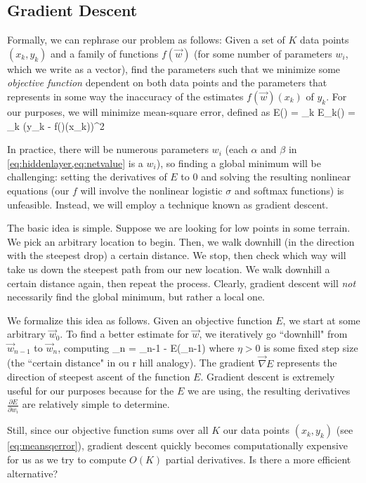 \documentclass{article}
\begin{document}
\subsection{Gradient Descent}

Formally, we can rephrase our problem as follows: Given a set of $K$ data points $(x_k, y_k)$ and a family of functions $f(\vec{w})$ (for some number of parameters $w_i$, which we write as a vector), find the parameters such that we minimize some \emph{objective function} dependent on both data points and the parameters that represents in some way the inaccuracy of the estimates $f(\vec{w})(x_k)$ of $y_k$. For our purposes, we will minimize mean-square error, defined as
\beq
\label{eq:meansqerror}
E() = \sum_k E_k() = \sum_k (y_k - f()(x_k))^2
\eeq

In practice, there will be numerous parameters $w_i$ (each $\alpha$ and $\beta$ in \cref{eq:hiddenlayer,eq:netvalue} is a $w_i$), so finding a global minimum will be challenging: setting the derivatives of $E$ to 0 and solving the resulting nonlinear equations (our $f$ will involve the nonlinear logistic $\sigma$ and softmax functions) is unfeasible. Instead, we will employ a technique known as gradient descent.

The basic idea is simple. Suppose we are looking for low points in some terrain. We pick an arbitrary location to begin. Then, we walk downhill (in the direction with the steepest drop) a certain distance. We stop, then check which way will take us down the steepest path from our new location. We walk downhill a certain distance again, then repeat the process. Clearly, gradient descent will \emph{not} necessarily find the global minimum, but rather a local one.

We formalize this idea as follows. Given an objective function $E$, we start at some arbitrary $\vec{w}_0$. To find a better estimate for $\vec{w}$, we iteratively go ``downhill" from $\vec{w}_{n-1}$ to $\vec{w}_{n}$, computing
\beq
{}_n = _{n-1} - \eta\vec{\nabla} E(_{n-1})
\eeq
where $\eta > 0$ is some fixed step size (the ``certain distance" in ou
r hill analogy). The gradient $\vec{\nabla} E$ represents the direction of steepest ascent of the function $E$. Gradient descent is extremely useful for our purposes because for the $E$ we are using, the resulting derivatives $\frac{\partial E}{\partial w_i}$ are relatively simple to determine.

Still, since our objective function sums over all $K$ our data points $(x_k, y_k)$ (see \cref{eq:meansqerror}), gradient descent quickly becomes computationally expensive for us as we try to compute $O(K)$ partial derivatives. Is there a more efficient alternative?
\end{document}
